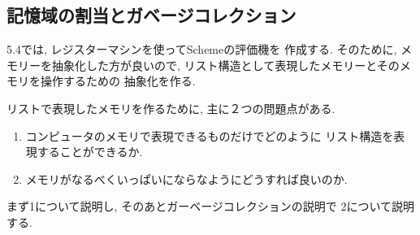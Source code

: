 \setcounter{subsection}{2}
\subsection{記憶域の割当とガベージコレクション}
5.4では, レジスターマシンを使ってSchemeの評価機を%
作成する. そのために, メモリーを抽象化した方が良いので,
リスト構造として表現したメモリーとそのメモリを操作するための%
抽象化を作る.

リストで表現したメモリを作るために, 主に２つの問題点がある.
\begin{enumerate}
\item コンピュータのメモリで表現できるものだけでどのように%
  リスト構造を表現することができるか.
\item メモリがなるべくいっぱいにならなようにどうすれば良いのか.
\end{enumerate}
%
まず1について説明し, そのあとガーベージコレクションの説明で%
2について説明する.
%

%

